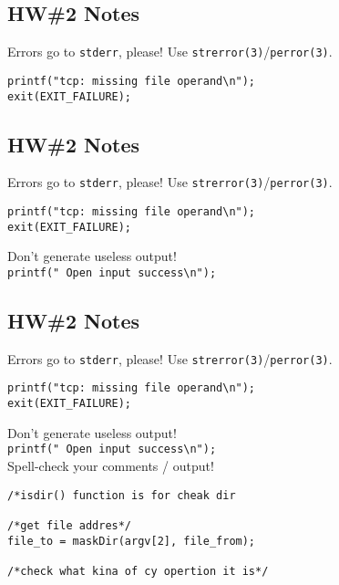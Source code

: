 \documentclass[xga]{xdvislides}
\begin{document}
\subsection{HW\#2 Notes}
Errors go to \verb+stderr+, please!  Use
\verb+strerror(3)+/\verb+perror(3)+. \\

\begin{verbatim}
printf("tcp: missing file operand\n");
exit(EXIT_FAILURE);
\end{verbatim}

\subsection{HW\#2 Notes}
Errors go to \verb+stderr+, please!  Use
\verb+strerror(3)+/\verb+perror(3)+. \\

\begin{verbatim}
printf("tcp: missing file operand\n");
exit(EXIT_FAILURE);
\end{verbatim}

Don't generate useless output! \\

\verb+printf(" Open input success\n");+ \\

\subsection{HW\#2 Notes}
Errors go to \verb+stderr+, please!  Use
\verb+strerror(3)+/\verb+perror(3)+. \\

\begin{verbatim}
printf("tcp: missing file operand\n");
exit(EXIT_FAILURE);
\end{verbatim}

Don't generate useless output! \\

\verb+printf(" Open input success\n");+ \\

Spell-check your comments / output! \\

\begin{verbatim}
/*isdir() function is for cheak dir

/*get file addres*/
file_to = maskDir(argv[2], file_from);

/*check what kina of cy opertion it is*/
\end{verbatim}
\end{document}
